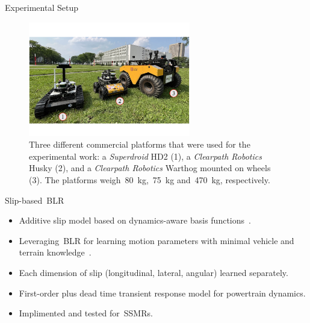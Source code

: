 \documentclass[final,hyperref={pdfpagelabels=false}]{beamer}
\begin{document}
\begin{frame}[t]
\begin{columns}[t]
\begin{column}{.465\textwidth}
\begin{block}{Experimental Setup}
	\begin{figure}%
		\begin{minipage}[b]{.32\textwidth}%
			\captionsetup{justification=justified, name=Figure 3}
			\caption{
				Three different commercial platforms that were used for the experimental work:
				a \emph{Superdroid} HD2 (1), a \emph{Clearpath Robotics} Husky (2), and a \emph{Clearpath Robotics} Warthog mounted
				on wheels (3). 
				The platforms weigh~\SI{80}{\kilo\gram},~\SI{75}{\kilo\gram} and~\SI{470}{\kilo\gram}, respectively.
			}
		\end{minipage}%
		\hskip10mm
		\includegraphics[width=0.63\textwidth]{./figures/norlab_robots_with_labels.pdf}
	\end{figure}
\end{block}


\begin{block}{Slip-based~\acf{BLR}}
	
	\begin{itemize}
		\item Additive slip model based on dynamics-aware basis functions~\cite{Seegmiller2013}.
		\item Leveraging~\acf{BLR} for learning motion parameters with minimal vehicle and terrain knowledge~\cite{McKinnon2019}.
		\item Each dimension of slip (longitudinal, lateral, angular) learned separately.
		\item First-order plus dead time transient response model for powertrain dynamics.
		\item Implimented and tested for~\acp{SSMR}.
	\end{itemize}
	

\end{block}
\end{column}
\end{columns}
\end{frame}
\end{document}
